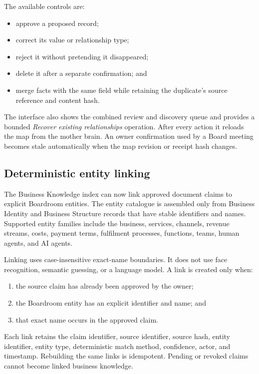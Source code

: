 The available controls are:

\begin{itemize}
  \item approve a proposed record;
  \item correct its value or relationship type;
  \item reject it without pretending it disappeared;
  \item delete it after a separate confirmation; and
  \item merge facts with the same field while retaining the duplicate's source
        reference and content hash.
\end{itemize}

The interface also shows the combined review and discovery queue and provides a
bounded \emph{Recover existing relationships} operation.  After every action it
reloads the map from the mother brain.  An owner confirmation used by a Board
meeting becomes stale automatically when the map revision or receipt hash
changes.

\subsection{Deterministic entity linking}

The Business Knowledge index can now link approved document claims to explicit
Boardroom entities.  The entity catalogue is assembled only from Business
Identity and Business Structure records that have stable identifiers and
names.  Supported entity families include the business, services, channels,
revenue streams, costs, payment terms, fulfilment processes, functions, teams,
human agents, and AI agents.

Linking uses case-insensitive exact-name boundaries.  It does not use face
recognition, semantic guessing, or a language model.  A link is created only
when:

\begin{enumerate}
  \item the source claim has already been approved by the owner;
  \item the Boardroom entity has an explicit identifier and name; and
  \item that exact name occurs in the approved claim.
\end{enumerate}

Each link retains the claim identifier, source identifier, source hash, entity
identifier, entity type, deterministic match method, confidence, actor, and
timestamp.  Rebuilding the same links is idempotent.  Pending or revoked claims
cannot become linked business knowledge.

